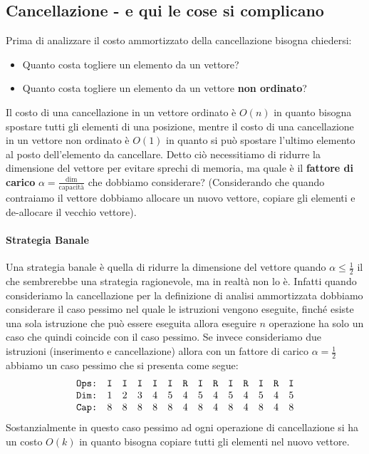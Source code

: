     \subsection[Cancellazione]{Cancellazione - e qui le cose si complicano}
        Prima di analizzare il costo ammortizzato della cancellazione bisogna chiedersi:\begin{itemize}
            \item Quanto costa togliere un elemento da un vettore?
            \item Quanto costa togliere un elemento da un vettore \textbf{non ordinato}?
        \end{itemize}
        Il costo di una cancellazione in un vettore ordinato è $O(n)$ in quanto bisogna spostare tutti gli elementi di una posizione, mentre il costo di una cancellazione in un vettore non ordinato è $O(1)$ in quanto si può spostare l'ultimo elemento al posto dell'elemento da cancellare. \newline
        Detto ciò necessitiamo di ridurre la dimensione del vettore per evitare sprechi di memoria, ma quale è il \textbf{fattore di carico} $\alpha=\frac{\text{dim}}{\text{capacità}}$ che dobbiamo considerare? (Considerando che quando contraiamo il vettore dobbiamo allocare un nuovo vettore, copiare gli elementi e de-allocare il vecchio vettore).
        \paragraph{Strategia Banale}
            Una strategia banale è quella di ridurre la dimensione del vettore quando $\alpha\leq\frac{1}{2}$ il che sembrerebbe una strategia ragionevole, ma in realtà non lo è. Infatti quando consideriamo la cancellazione per la definizione di analisi ammortizzata dobbiamo considerare il caso pessimo nel quale le istruzioni vengono eseguite, finché esiste una sola istruzione che può essere eseguita allora eseguire $n$ operazione ha solo un caso che quindi coincide con il caso pessimo. Se invece consideriamo due istruzioni (inserimento e cancellazione) allora con un fattore di carico $\alpha=\frac{1}{2}$ abbiamo un caso pessimo che si presenta come segue:
            $$\begin{array}{l c c c c c c c c c c c c c}
                \texttt{Ops:} & \texttt{I} & \texttt{I} & \texttt{I} & \texttt{I} & \texttt{I} & \texttt{R} & \texttt{I} & \texttt{R} & \texttt{I} & \texttt{R} & \texttt{I} & \texttt{R} & \texttt{I}\\
                \texttt{Dim:} & 1 & 2 & 3 & 4 & 5 & 4 & 5 & 4 & 5 & 4 & 5 & 4 & 5\\
                \texttt{Cap:} & 8 & 8 & 8 & 8 & 8 & 4 & 8 & 4 & 8 & 4 & 8 & 4 & 8
            \end{array}$$
            Sostanzialmente in questo caso pessimo ad ogni operazione di cancellazione si ha un costo $O(k)$ in quanto bisogna copiare tutti gli elementi nel nuovo vettore.
